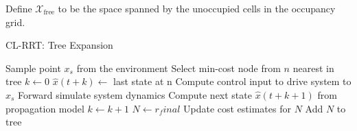 Define $\mathcal{X}_\text{free}$ to be the space spanned by the unoccupied cells in the occupancy grid.

\begin{algorithm}
\caption{CL-RRT: Tree Expansion}
\label{alg:clrrt_expansion}
\begin{algorithmic}[1]
\State Sample point $x_s$ from the environment
\State Select min-cost node from $n$ nearest in tree
\State $k \gets 0$
\State $\hat{x}(t+k) \gets $ last state at n
	\State Compute control input to drive system to $x_s$
	\State Forward simulate system dynamics
	\State Compute next state $\hat{x}(t+k+1)$ from propagation model
	\State $k \gets k+1$
\EndWhile
$N \gets r_final$
	\State Update cost estimates for $N$
	\State Add $N$ to tree
\EndFor
\end{algorithmic}
\end{algorithm}
